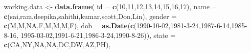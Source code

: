 \documentclass[
]{book}
\newenvironment{Shaded}{\begin{snugshade}}{\end{snugshade}}
\newcommand{\AttributeTok}[1]{\textcolor[rgb]{0.13,0.29,0.53}{#1}}
\newcommand{\ConstantTok}[1]{\textcolor[rgb]{0.56,0.35,0.01}{#1}}
\newcommand{\DecValTok}[1]{\textcolor[rgb]{0.00,0.00,0.81}{#1}}
\newcommand{\FunctionTok}[1]{\textcolor[rgb]{0.13,0.29,0.53}{\textbf{#1}}}
\newcommand{\NormalTok}[1]{#1}
\newcommand{\OtherTok}[1]{\textcolor[rgb]{0.56,0.35,0.01}{#1}}
\newcommand{\StringTok}[1]{\textcolor[rgb]{0.31,0.60,0.02}{#1}}
\begin{document}
\begin{Shaded}
\begin{Highlighting}[]
\NormalTok{working.data }\OtherTok{\textless{}{-}} \FunctionTok{data.frame}\NormalTok{(}
  \AttributeTok{id =} \FunctionTok{c}\NormalTok{(}\DecValTok{10}\NormalTok{,}\DecValTok{11}\NormalTok{,}\DecValTok{12}\NormalTok{,}\DecValTok{13}\NormalTok{,}\DecValTok{14}\NormalTok{,}\DecValTok{15}\NormalTok{,}\DecValTok{16}\NormalTok{,}\DecValTok{17}\NormalTok{),}
  \AttributeTok{name =} \FunctionTok{c}\NormalTok{(}\StringTok{\textquotesingle{}sai\textquotesingle{}}\NormalTok{,}\StringTok{\textquotesingle{}ram\textquotesingle{}}\NormalTok{,}\StringTok{\textquotesingle{}deepika\textquotesingle{}}\NormalTok{,}\StringTok{\textquotesingle{}sahithi\textquotesingle{}}\NormalTok{,}\StringTok{\textquotesingle{}kumar\textquotesingle{}}\NormalTok{,}\StringTok{\textquotesingle{}scott\textquotesingle{}}\NormalTok{,}\StringTok{\textquotesingle{}Don\textquotesingle{}}\NormalTok{,}\StringTok{\textquotesingle{}Lin\textquotesingle{}}\NormalTok{),}
  \AttributeTok{gender =} \FunctionTok{c}\NormalTok{(}\StringTok{\textquotesingle{}M\textquotesingle{}}\NormalTok{,}\StringTok{\textquotesingle{}M\textquotesingle{}}\NormalTok{,}\ConstantTok{NA}\NormalTok{,}\StringTok{\textquotesingle{}F\textquotesingle{}}\NormalTok{,}\StringTok{\textquotesingle{}M\textquotesingle{}}\NormalTok{,}\StringTok{\textquotesingle{}M\textquotesingle{}}\NormalTok{,}\StringTok{\textquotesingle{}M\textquotesingle{}}\NormalTok{,}\StringTok{\textquotesingle{}F\textquotesingle{}}\NormalTok{),}
  \AttributeTok{dob =} \FunctionTok{as.Date}\NormalTok{(}\FunctionTok{c}\NormalTok{(}\StringTok{\textquotesingle{}1990{-}10{-}02\textquotesingle{}}\NormalTok{,}\StringTok{\textquotesingle{}1981{-}3{-}24\textquotesingle{}}\NormalTok{,}\StringTok{\textquotesingle{}1987{-}6{-}14\textquotesingle{}}\NormalTok{,}\StringTok{\textquotesingle{}1985{-}8{-}16\textquotesingle{}}\NormalTok{,}
                  \StringTok{\textquotesingle{}1995{-}03{-}02\textquotesingle{}}\NormalTok{,}\StringTok{\textquotesingle{}1991{-}6{-}21\textquotesingle{}}\NormalTok{,}\StringTok{\textquotesingle{}1986{-}3{-}24\textquotesingle{}}\NormalTok{,}\StringTok{\textquotesingle{}1990{-}8{-}26\textquotesingle{}}\NormalTok{)),}
  \AttributeTok{state =} \FunctionTok{c}\NormalTok{(}\StringTok{\textquotesingle{}CA\textquotesingle{}}\NormalTok{,}\StringTok{\textquotesingle{}NY\textquotesingle{}}\NormalTok{,}\ConstantTok{NA}\NormalTok{,}\ConstantTok{NA}\NormalTok{,}\StringTok{\textquotesingle{}DC\textquotesingle{}}\NormalTok{,}\StringTok{\textquotesingle{}DW\textquotesingle{}}\NormalTok{,}\StringTok{\textquotesingle{}AZ\textquotesingle{}}\NormalTok{,}\StringTok{\textquotesingle{}PH\textquotesingle{}}\NormalTok{),}

\end{Highlighting}
\end{Shaded}
\end{document}
